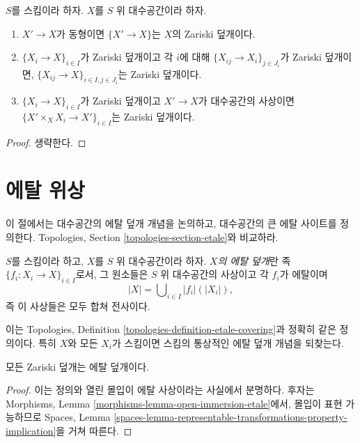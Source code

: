\begin{lemma}
\label{lemma-zariski}
$S$를 스킴이라 하자. $X$를 $S$ 위 대수공간이라 하자.
\begin{enumerate}
\item $X' \to X$가 동형이면 $\{X' \to X\}$는 $X$의 Zariski 덮개이다.
\item $\{X_i \to X\}_{i\in I}$가 Zariski 덮개이고 각 $i$에 대해
$\{X_{ij} \to X_i\}_{j\in J_i}$가 Zariski 덮개이면,
$\{X_{ij} \to X\}_{i \in I, j\in J_i}$는 Zariski 덮개이다.
\item $\{X_i \to X\}_{i\in I}$가 Zariski 덮개이고 $X' \to X$가
대수공간의 사상이면
$\{X' \times_X X_i \to X'\}_{i\in I}$는 Zariski 덮개이다.
\end{enumerate}
\end{lemma}

\begin{proof}
생략한다.
\end{proof}











\section{에탈 위상}
\label{section-etale}

\noindent
이 절에서는 대수공간의 에탈 덮개 개념을 논의하고, 대수공간의 큰 에탈
사이트를 정의한다. Topologies, Section
\ref{topologies-section-etale}와 비교하라.

\begin{definition}
\label{definition-etale-covering}
$S$를 스킴이라 하고, $X$를 $S$ 위 대수공간이라 하자. {\it $X$의 에탈
덮개}란 족 $\{f_i : X_i \to X\}_{i \in I}$로서, 그 원소들은
$S$ 위 대수공간의 사상이고 각 $f_i$가 에탈이며
$$
|X| = \bigcup\nolimits_{i \in I} |f_i|(|X_i|),
$$
즉 이 사상들은 모두 합쳐 전사이다.
\end{definition}

\noindent
이는 Topologies, Definition \ref{topologies-definition-etale-covering}과
정확히 같은 정의이다. 특히 $X$와 모든 $X_i$가 스킴이면 스킴의 통상적인
에탈 덮개 개념을 되찾는다.

\begin{lemma}
\label{lemma-zariski-etale}
모든 Zariski 덮개는 에탈 덮개이다.
\end{lemma}

\begin{proof}
이는 정의와 열린 몰입이 에탈 사상이라는 사실에서 분명하다. 후자는
Morphisms, Lemma \ref{morphisms-lemma-open-immersion-etale}에서, 몰입이
표현 가능하므로 Spaces, Lemma
\ref{spaces-lemma-representable-transformations-property-implication}을 거쳐 따른다.
\end{proof}


